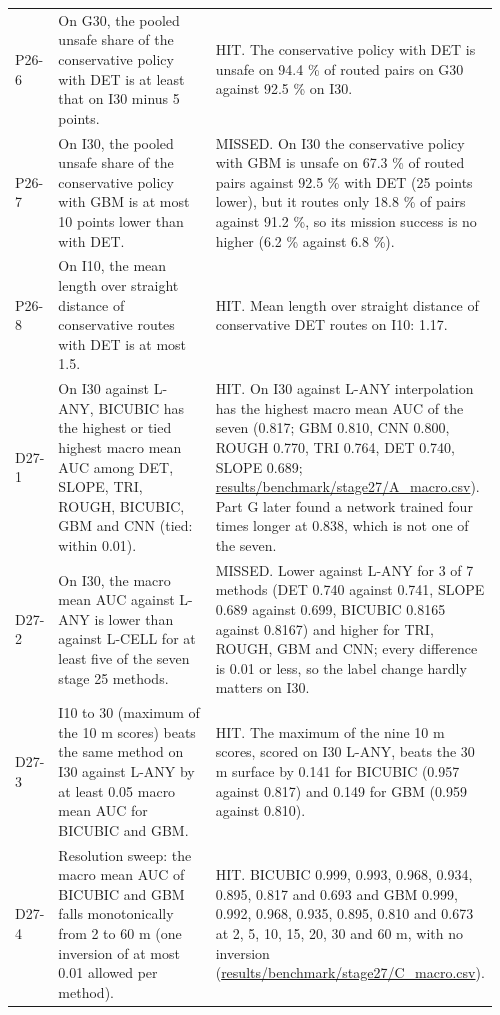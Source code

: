 \documentclass[10pt]{article}
\begin{document}
\begin{longtable}{@{}p{0.08\linewidth}p{0.42\linewidth}p{0.46\linewidth}@{}}
P26-6 & On G30, the pooled unsafe share of the conservative policy with DET is at least that on I30 minus 5 points. & HIT. The conservative policy with DET is unsafe on 94.4 \% of routed pairs on G30 against 92.5 \% on I30. \\
P26-7 & On I30, the pooled unsafe share of the conservative policy with GBM is at most 10 points lower than with DET. & MISSED. On I30 the conservative policy with GBM is unsafe on 67.3 \% of routed pairs against 92.5 \% with DET (25 points lower), but it routes only 18.8 \% of pairs against 91.2 \%, so its mission success is no higher (6.2 \% against 6.8 \%). \\
P26-8 & On I10, the mean length over straight distance of conservative routes with DET is at most 1.5. & HIT. Mean length over straight distance of conservative DET routes on I10: 1.17. \\
D27-1 & On I30 against L-ANY, BICUBIC has the highest or tied highest macro mean AUC among DET, SLOPE, TRI, ROUGH, BICUBIC, GBM and CNN (tied: within 0.01). & HIT. On I30 against L-ANY interpolation has the highest macro mean AUC of the seven (0.817; GBM 0.810, CNN 0.800, ROUGH 0.770, TRI 0.764, DET 0.740, SLOPE 0.689; \url{results/benchmark/stage27/A_macro.csv}). Part G later found a network trained four times longer at 0.838, which is not one of the seven. \\
D27-2 & On I30, the macro mean AUC against L-ANY is lower than against L-CELL for at least five of the seven stage 25 methods. & MISSED. Lower against L-ANY for 3 of 7 methods (DET 0.740 against 0.741, SLOPE 0.689 against 0.699, BICUBIC 0.8165 against 0.8167) and higher for TRI, ROUGH, GBM and CNN; every difference is 0.01 or less, so the label change hardly matters on I30. \\
D27-3 & I10 to 30 (maximum of the 10 m scores) beats the same method on I30 against L-ANY by at least 0.05 macro mean AUC for BICUBIC and GBM. & HIT. The maximum of the nine 10 m scores, scored on I30 L-ANY, beats the 30 m surface by 0.141 for BICUBIC (0.957 against 0.817) and 0.149 for GBM (0.959 against 0.810). \\
D27-4 & Resolution sweep: the macro mean AUC of BICUBIC and GBM falls monotonically from 2 to 60 m (one inversion of at most 0.01 allowed per method). & HIT. BICUBIC 0.999, 0.993, 0.968, 0.934, 0.895, 0.817 and 0.693 and GBM 0.999, 0.992, 0.968, 0.935, 0.895, 0.810 and 0.673 at 2, 5, 10, 15, 20, 30 and 60 m, with no inversion (\url{results/benchmark/stage27/C_macro.csv}). \\

\end{longtable}
\end{document}

